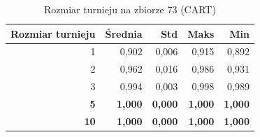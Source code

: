 \begin{table}[htbp]
\centering
\small
\setlength{\tabcolsep}{6pt}
\renewcommand{\arraystretch}{1.2}
\caption{Rozmiar turnieju na zbiorze 73 (CART)}
\label{tab:CART_tournament_size_73}
\begin{tabular}{r|r|r|r|r}
\toprule
Rozmiar turnieju & Średnia & Std & Maks & Min \\
\hline
1 & 0,902 & 0,006 & 0,915 & 0,892 \\
2 & 0,962 & 0,016 & 0,986 & 0,931 \\
3 & 0,994 & 0,003 & 0,998 & 0,989 \\
\textbf{5} & \textbf{1,000} & \textbf{0,000} & \textbf{1,000} & \textbf{1,000} \\
\textbf{10} & \textbf{1,000} & \textbf{0,000} & \textbf{1,000} & \textbf{1,000} \\
\bottomrule
\end{tabular}
\end{table}